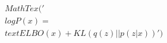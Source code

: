 \documentclass[preview]{standalone}
\begin{document}
\begin{align*}
MathTex('\\log P(x) = \\text{ELBO}(x) + KL(q(z) || p(z|x))')
\end{align*}
\end{document}
